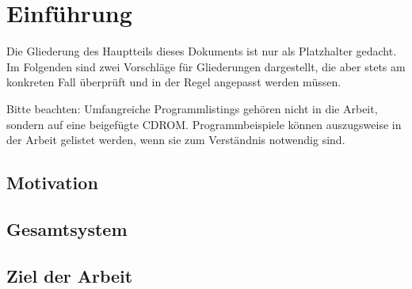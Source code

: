\chapter{Einf\"uhrung}
Die Gliederung des Hauptteils dieses Dokuments ist nur als Platzhalter gedacht. 
Im Folgenden sind zwei Vorschl\"age f\"ur Gliederungen dargestellt, die
aber stets am konkreten Fall \"uberpr\"uft und in der Regel angepasst werden
m\"ussen.

Bitte beachten: Umfangreiche Programmlistings geh\"oren nicht in die Arbeit, 
sondern auf eine beigef\"ugte CDROM. Programmbeispiele k\"onnen auszugsweise
in der Arbeit gelistet werden, wenn sie zum Verst\"andnis notwendig sind.

\section{Motivation}
\section{Gesamtsystem}
\section{Ziel der Arbeit}
